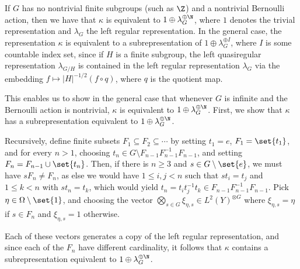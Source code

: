 \documentclass[10pt]{mypackage}
\begin{document}
If $G$ has no nontrivial finite subgroups (such as $\Z$) and a nontrivial Bernoulli action, then we have that $\kappa$ is equivalent to $1 \oplus \lambda_{G}^{\oplus \N}$, where $1$ denotes the trivial representation and $\lambda_G$ the left regular representation. In the general case, the representation $\kappa$ is equivalent to a subrepresentation of $1 \oplus \lambda_G^{\oplus I}$, where $I$ is some countable index set, since if $H$ is a finite subgroup, the left quasiregular representation $\lambda_{G/H}$ is contained in the left regular representation $\lambda_G$ via the embedding $f\mapsto \left\vert H \right\vert^{-1/2}\left( f\circ q \right)$, where $q$ is the quotient map.

This enables us to show in the general case that whenever $G$ is infinite and the Bernoulli action is nontrivial, $\kappa$ is equivalent to $1\oplus \lambda_G^{\oplus \N}$. First, we show that $\kappa$ has a subrepresentation equivalent to $1\oplus \lambda_G^{\oplus \N}$.

Recursively, define finite subsets $F_1\subseteq F_2\subseteq\cdots$ by setting $t_1 = e$, $F_1 = \set{t_1}$, and for every $n > 1$, choosing $t_n\in G\setminus F_{n-1}F_{n-1}^{-1}F_{n-1}$, and setting $F_n = F_{n-1}\cup \set{t_n}$. Then, if there is $n \geq 3$ and $s\in G\setminus \set{e}$, we must have $sF_n \neq F_n$, as else we would have $1\leq i,j < n$ such that $st_i = t_j$ and $1\leq k < n$ with $st_n = t_k$, which would yield $t_n = t_it_j^{-1}t_k\in F_{n-1}F_{n-1}^{-1}F_{n-1}$. Pick $\eta\in \Omega\setminus \set{1}$, and choosing the vector $\bigotimes_{s\in G}\xi_{\eta,s}\in L^2\left( Y \right)^{\otimes G}$ where $\xi_{\eta,s} = \eta$ if $s\in F_n$ and $\xi_{\eta,s} = 1$ otherwise.

Each of these vectors generates a copy of the left regular representation, and since each of the $F_n$ have different cardinality, it follows that $\kappa$ contains a subrepresentation equivalent to $1 \oplus \lambda_G^{\oplus \N}$.
\end{document}
